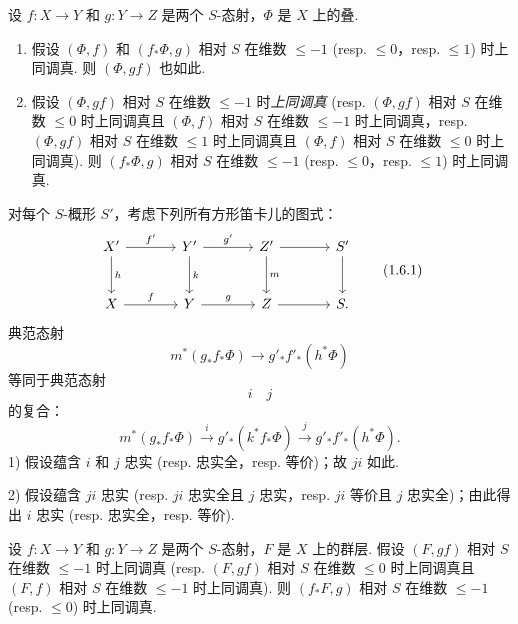 \begin{proposition}\label{prop:XIII.1.6}
设 $f \colon X \to Y$ 和 $g \colon Y \to Z$ 是两个 $S$-态射，$\Phi$ 是 $X$ 上的叠.
\begin{enumerate}[1)]
\item 假设 $(\Phi, f)$ 和 $(f_* \Phi, g)$ 相对 $S$ 在维数 $\leqslant -1$ (resp. $\leqslant 0$，resp. $\leqslant 1$) 时上同调真. 则 $(\Phi, gf)$ 也如此.
\item 假设 $(\Phi, gf)$ 相对 $S$ 在维数 $\leqslant -1$ 时\emph{上同调真} (resp. $(\Phi, gf)$ 相对 $S$ 在维数 $\leqslant 0$ 时上同调真且 $(\Phi, f)$ 相对 $S$ 在维数 $\leqslant -1$ 时上同调真，resp. $(\Phi, gf)$ 相对 $S$ 在维数 $\leqslant 1$ 时上同调真且 $(\Phi, f)$ 相对 $S$ 在维数 $\leqslant 0$ 时上同调真). 则 $(f_* \Phi, g)$ 相对 $S$ 在维数 $\leqslant -1$ (resp. $\leqslant 0$，resp. $\leqslant 1$) 时上同调真.
\end{enumerate}
\end{proposition}

对每个 $S$-概形 $S'$，考虑下列所有方形笛卡儿的图式：
\begin{equation}
\begin{tikzcd}[row sep=large, column sep=large]
X' \arrow[r,"{f'}"] \arrow[d,"{h}"] & Y' \arrow[r,"{g'}"] \arrow[d,"{k}"] & Z' \arrow[r] \arrow[d,"{m}"] & S' \arrow[d] \\
X \arrow[r,"{f}"] & Y \arrow[r,"{g}"] & Z \arrow[r] & S.
\end{tikzcd}
\tag{1.6.1}
\label{eq:XIII.1.6.1}
\end{equation}
典范态射
\[
m^{*}(g_* f_* \Phi) \longrightarrow g'_* f'_*(h^{*} \Phi)
\]
等同于典范态射
\[
i \quad j
\]
的复合：
\[
m^{*}(g_* f_* \Phi) \xrightarrow{i} g'_*(k^{*} f_* \Phi) \xrightarrow{j} g'_* f'_*(h^{*} \Phi).
\]
1) 假设蕴含 $i$ 和 $j$ 忠实 (resp. 忠实全，resp. 等价)；故 $ji$ 如此.

2) 假设蕴含 $ji$ 忠实 (resp. $ji$ 忠实全且 $j$ 忠实，resp. $ji$ 等价且 $j$ 忠实全)；由此得出 $i$ 忠实 (resp. 忠实全，resp. 等价).

\begin{corollary}\label{cor:XIII.1.7}
设 $f \colon X \to Y$ 和 $g \colon Y \to Z$ 是两个 $S$-态射，$F$ 是 $X$ 上的群层. 假设 $(F, gf)$ 相对 $S$ 在维数 $\leqslant -1$ 时上同调真 (resp. $(F, gf)$ 相对 $S$ 在维数 $\leqslant 0$ 时上同调真且 $(F, f)$ 相对 $S$ 在维数 $\leqslant -1$ 时上同调真). 则 $(f_* F, g)$ 相对 $S$ 在维数 $\leqslant -1$ (resp. $\leqslant 0$) 时上同调真.
\end{corollary}

